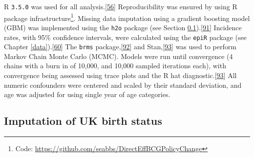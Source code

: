 \documentclass[11pt,twoside]{bristolthesis}
\begin{document}
  R \texttt{3.5.0} was used for all analysis.{[}\protect\hyperlink{ref-R}{56}{]} Reproducibility was ensured by using R package infrastructure\footnote{Code: \url{https://github.com/seabbs/DirectEffBCGPolicyChange}}. Missing data imputation using a gradient boosting model (GBM) was implemented using the \texttt{h2o} package (see Section \ref{imp-uk-birth-status}).{[}\protect\hyperlink{ref-h2o2018}{91}{]} Incidence rates, with 95\% confidence intervals, were calculated using the \texttt{epiR} package (see Chapter \ref{data}).{[}\protect\hyperlink{ref-EpiR}{60}{]} The \texttt{brms} package,{[}\protect\hyperlink{ref-Burkner}{92}{]} and Stan,{[}\protect\hyperlink{ref-StanDevelopmentTeam2016}{93}{]} was used to perform Markov Chain Monte Carlo (MCMC). Models were run until convergence (4 chains with a burn in of 10,000, and 10,000 sampled iterations each), with convergence being assessed using trace plots and the R hat diagnostic.{[}\protect\hyperlink{ref-StanDevelopmentTeam2016}{93}{]} All numeric confounders were centered and scaled by their standard deviation, and age was adjusted for using single year of age categories.
  
  \hypertarget{imp-uk-birth-status}{%
  \subsection{Imputation of UK birth status}\label{imp-uk-birth-status}}
  
\end{document}
